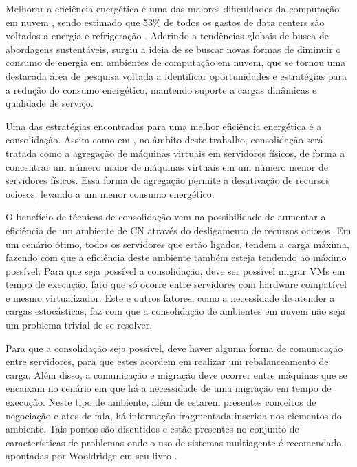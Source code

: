Melhorar a eficiência energética é uma das maiores dificuldades da computação em nuvem \cite{challenges}, sendo estimado que 53\% de todos os gastos de data centers são voltados a energia e refrigeração \cite{micro-slice}. Aderindo a tendências globais de busca de abordagens sustentáveis, surgiu a ideia de se buscar novas formas de diminuir o consumo de energia em ambientes de computação em nuvem, que se tornou uma destacada área de pesquisa voltada a identificar oportunidades e estratégias para a redução do consumo energético, mantendo suporte a cargas dinâmicas e qualidade de serviço.

Uma das estratégias encontradas para uma melhor eficiência energética é a consolidação. Assim como em , no âmbito deste trabalho, consolidação será tratada como a agregação de máquinas virtuais em servidores físicos, de forma a concentrar um número maior de máquinas virtuais em um número menor de servidores físicos. Essa forma de agregação permite a desativação de recursos ociosos, levando a um menor consumo energético.

O benefício de técnicas de consolidação vem na possibilidade de aumentar a eficiência de um ambiente de CN através do desligamento de recursos ociosos. Em um cenário ótimo, todos os servidores que estão ligados, tendem a carga máxima, fazendo com que a eficiência deste ambiente também esteja tendendo ao máximo possível. Para que seja possível a consolidação, deve ser possível migrar VMs em tempo de execução, fato que só ocorre entre servidores com hardware compatível e mesmo virtualizador. Este e outros fatores, como a necessidade de atender a cargas estocásticas, faz com que a consolidação de ambientes em nuvem não seja um problema trivial de se resolver.\par

Para que a consolidação seja possível, deve haver alguma forma de comunicação entre servidores, para que estes acordem em realizar um rebalanceamento de carga. Além disso, a comunicação e migração deve ocorrer entre máquinas que se encaixam no cenário em que há a necessidade de uma migração em tempo de execução. Neste tipo de ambiente, além de estarem presentes conceitos de negociação e atos de fala, há informação fragmentada inserida nos elementos do ambiente. Tais pontos são discutidos e estão presentes no conjunto de características de problemas onde o uso de sistemas multiagente é recomendado, apontadas por Wooldridge em seu livro \cite{wooldridge2009introduction}.
